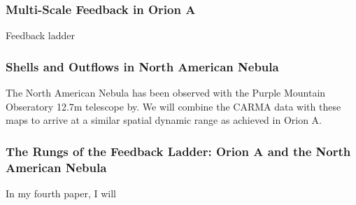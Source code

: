 \subsubsection{Multi-Scale Feedback in Orion A}\label{sec:paper2}
        Feedback ladder
\subsubsection{Shells and Outflows in North American Nebula}\label{sec:paper3}
        The North American Nebula has been observed with the Purple Mountain Obseratory 12.7m telescope by. We will combine the CARMA data with these maps to arrive at a similar spatial dynamic range as achieved in Orion A.
\subsubsection{The Rungs of the Feedback Ladder: Orion A and the North American Nebula}\label{sec:paper4}
        In my fourth paper, I will 

    